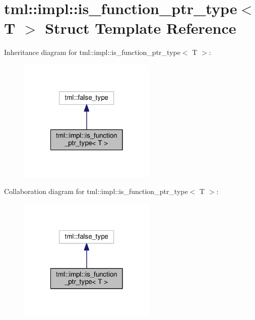 \hypertarget{structtml_1_1impl_1_1is__function__ptr__type}{\section{tml\+:\+:impl\+:\+:is\+\_\+function\+\_\+ptr\+\_\+type$<$ T $>$ Struct Template Reference}
\label{structtml_1_1impl_1_1is__function__ptr__type}
}


Inheritance diagram for tml\+:\+:impl\+:\+:is\+\_\+function\+\_\+ptr\+\_\+type$<$ T $>$\+:
\nopagebreak
\begin{figure}[H]
\begin{center}
\leavevmode
\includegraphics[width=186pt]{structtml_1_1impl_1_1is__function__ptr__type__inherit__graph}
\end{center}
\end{figure}


Collaboration diagram for tml\+:\+:impl\+:\+:is\+\_\+function\+\_\+ptr\+\_\+type$<$ T $>$\+:
\nopagebreak
\begin{figure}[H]
\begin{center}
\leavevmode
\includegraphics[width=186pt]{structtml_1_1impl_1_1is__function__ptr__type__coll__graph}
\end{center}
\end{figure}


